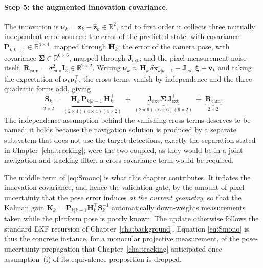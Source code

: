 \paragraph*{Step 5: the augmented innovation covariance.} The innovation is
$\bm{\nu}_k=\bm{z}_k-\hat{\bm{z}}_k\in\mathbb{R}^{2}$, and to first order it
collects three mutually independent error sources: the error of the predicted
state, with covariance $\bm{P}_{k|k-1}\in\mathbb{R}^{4\times4}$, mapped through
$\bm{H}_k$; the error of the camera pose, with covariance
$\bm{\Sigma}\in\mathbb{R}^{6\times6}$, mapped through $\bm{J}_{\mathrm{ext}}$; and
the pixel measurement noise itself,
$\bm{R}_{\mathrm{cam}}=\sigma_{\mathrm{cam}}^2\bm{I}_2\in\mathbb{R}^{2\times2}$.
Writing $\bm{\nu}_k\approx\bm{H}_k\,\delta\bm{x}_{k|k-1}+\bm{J}_{\mathrm{ext}}\,\bm{\xi}+\bm{v}_k$
and taking the expectation of $\bm{\nu}_k\bm{\nu}_k^{\top}$, the cross terms
vanish by independence and the three quadratic forms add, giving
\begin{equation}
  \underbrace{\bm{S}_k}_{2\times2}
  = \underbrace{\bm{H}_k\,\bm{P}_{k|k-1}\,\bm{H}_k^{\!\top}}_{(2\times4)(4\times4)(4\times2)}
  \;+\; \underbrace{\bm{J}_{\mathrm{ext}}\,\bm{\Sigma}\,\bm{J}_{\mathrm{ext}}^{\!\top}}_{(2\times6)(6\times6)(6\times2)}
  \;+\; \underbrace{\bm{R}_{\mathrm{cam}}}_{2\times2}.
  \label{eq:Smono}
\end{equation}
The independence assumption behind the vanishing cross terms deserves to be named:
it holds because the navigation solution is produced by a separate subsystem that
does not use the target detections, exactly the separation stated in
Chapter~\ref{cha:tracking}; were the two coupled, as they would be in a joint
navigation-and-tracking filter, a cross-covariance term would be required.

The middle term of \eqref{eq:Smono} is what this chapter contributes. It inflates
the innovation covariance, and hence the validation gate, by the amount of pixel
uncertainty that the pose error induces \emph{at the current geometry}, so that
the Kalman gain $\bm{K}_k=\bm{P}_{k|k-1}\bm{H}_k^{\top}\bm{S}_k^{-1}$
automatically down-weights measurements taken while the platform pose is poorly
known. The update otherwise follows the standard EKF recursion of
Chapter~\ref{cha:background}. Equation \eqref{eq:Smono} is thus the concrete
instance, for a monocular projective measurement, of the pose-uncertainty
propagation that Chapter~\ref{cha:tracking} anticipated once assumption~(i) of its
equivalence proposition is dropped.

